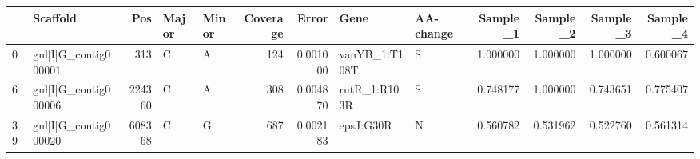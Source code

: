 \begin{tabular}{llrllrrllrrrr}
\toprule
{} &              Scaffold &     Pos & Major & Minor &  Coverage &     Error &           Gene & AA-change &  Sample\_1 &  Sample\_2 &  Sample\_3 &  Sample\_4 \\
\midrule
0  &  gnl|I|G\_contig000001 &     313 &     C &     A &       124 &  0.001000 &  vanYB\_1:T108T &         S &  1.000000 &  1.000000 &  1.000000 &  0.600067 \\
6  &  gnl|I|G\_contig000006 &  224360 &     C &     A &       308 &  0.004870 &   rutR\_1:R103R &         S &  0.748177 &  1.000000 &  0.743651 &  0.775407 \\
39 &  gnl|I|G\_contig000020 &  608368 &     C &     G &       687 &  0.002183 &      epsJ:G30R &         N &  0.560782 &  0.531962 &  0.522760 &  0.561314 \\
\bottomrule
\end{tabular}
